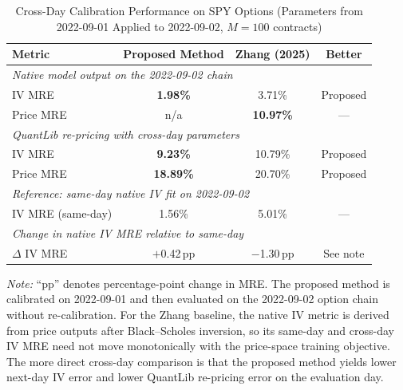 \begin{table}[htbp]
  \centering
  \caption{Cross-Day Calibration Performance on SPY Options (Parameters from 2022-09-01 Applied to 2022-09-02, $M=100$ contracts)}
  \label{tab:spy_crossday}
  \setlength{\tabcolsep}{7pt}
  \begin{tabular}{lccc}
    \toprule
    \textbf{Metric} & \textbf{Proposed Method} & \textbf{Zhang (2025)} & \textbf{Better} \\
    \midrule
    \multicolumn{4}{l}{\textit{Native model output on the 2022-09-02 chain}} \\
    \quad IV MRE & \textbf{1.98\%} & 3.71\% & Proposed \\
    \quad Price MRE & n/a & \textbf{10.97\%} & --- \\
    \midrule
    \multicolumn{4}{l}{\textit{QuantLib re-pricing with cross-day parameters}} \\
    \quad IV MRE & \textbf{9.23\%} & 10.79\% & Proposed \\
    \quad Price MRE & \textbf{18.89\%} & 20.70\% & Proposed \\
    \midrule
    \multicolumn{4}{l}{\textit{Reference: same-day native IV fit on 2022-09-02}} \\
    \quad IV MRE (same-day) & 1.56\% & 5.01\% & --- \\
    \midrule
    \multicolumn{4}{l}{\textit{Change in native IV MRE relative to same-day}} \\
    \quad $\Delta$ IV MRE & $+$0.42\,pp & $-$1.30\,pp & See note \\
    \bottomrule
  \end{tabular}
  \begin{tablenotes}
    \small
    \item \textit{Note:} ``pp'' denotes percentage-point change in MRE. The proposed method is calibrated on 2022-09-01 and then evaluated on the 2022-09-02 option chain without re-calibration. For the Zhang baseline, the native IV metric is derived from price outputs after Black--Scholes inversion, so its same-day and cross-day IV MRE need not move monotonically with the price-space training objective. The more direct cross-day comparison is that the proposed method yields lower next-day IV error and lower QuantLib re-pricing error on the evaluation day.
  \end{tablenotes}
\end{table}
